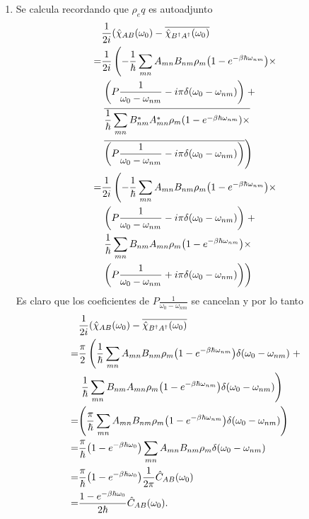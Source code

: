 \documentclass{article}
\begin{document}
\begin{enumerate}
\item Se calcula recordando que $\rho_eq$ es autoadjunto
\begin{align}
\begin{split}
&\frac{1}{2i}(\hat{\chi}_{AB}(\omega_0)-\overline{\hat{\chi}_{B^\dagger A^\dagger}(\omega_0)}\\
=&\frac{1}{2i}\left(-\frac{1}{\hbar}\sum_{mn}A_{mn}B_{nm}\rho_m\qty(1-e^{-\beta\hbar\omega_{nm}})\times\right.\\
&\left.\qty(P\frac{1}{\omega_0-\omega_{nm}}-i\pi\delta(\omega_0-\omega_{nm}))\right.+\\
&\left.\overline{\frac{1}{\hbar}\sum_{mn}B_{nm}^*A_{mn}^*\rho_m\qty(1-e^{-\beta\hbar\omega_{nm}})\times}\right.\\
&\left.\overline{\qty(P\frac{1}{\omega_0-\omega_{nm}}-i\pi\delta(\omega_0-\omega_{nm}))}\right)\\
=&\frac{1}{2i}\left(-\frac{1}{\hbar}\sum_{mn}A_{mn}B_{nm}\rho_m\qty(1-e^{-\beta\hbar\omega_{nm}})\times\right.\\
&\left.\qty(P\frac{1}{\omega_0-\omega_{nm}}-i\pi\delta(\omega_0-\omega_{nm}))\right.+\\
&\left.\frac{1}{\hbar}\sum_{mn}B_{nm}A_{mn}\rho_m\qty(1-e^{-\beta\hbar\omega_{nm}})\times\right.\\
&\left.\qty(P\frac{1}{\omega_0-\omega_{nm}}+i\pi\delta(\omega_0-\omega_{nm}))\right)
\end{split}
\end{align}
Es claro que los coeficientes de $P\frac{1}{\omega_0-\omega_{nm}}$ se cancelan y por lo tanto
\begin{align}
\begin{split}
&\frac{1}{2i}(\hat{\chi}_{AB}(\omega_0)-\overline{\hat{\chi}_{B^\dagger A^\dagger}(\omega_0)}\\
=&\frac{\pi}{2}\left(\frac{1}{\hbar}\sum_{mn}A_{mn}B_{nm}\rho_m\qty(1-e^{-\beta\hbar\omega_{nm}})\delta(\omega_0-\omega_{nm})\right.+\\
&\left.\frac{1}{\hbar}\sum_{mn}B_{nm}A_{mn}\rho_m\qty(1-e^{-\beta\hbar\omega_{nm}})\delta(\omega_0-\omega_{nm})\right)\\
=&\qty(\frac{\pi}{\hbar}\sum_{mn}A_{mn}B_{nm}\rho_m\qty(1-e^{-\beta\hbar\omega_{nm}})\delta(\omega_0-\omega_{nm}))\\
=&\frac{\pi}{\hbar}\qty(1-e^{-\beta\hbar\omega_0})\sum_{mn}A_{mn}B_{nm}\rho_m\delta(\omega_0-\omega_{nm})\\
=&\frac{\pi}{\hbar}\qty(1-e^{-\beta\hbar\omega_0})\frac{1}{2\pi}\hat{C}_{AB}(\omega_0)\\
=&\frac{1-e^{-\beta\hbar\omega_0}}{2\hbar}\hat{C}_{AB}(\omega_0).
\end{split}
\end{align}


\end{enumerate}
\end{document}
